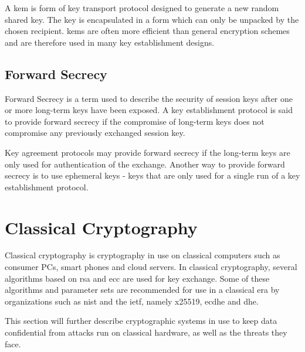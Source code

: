 A \gls{kem} is form of key transport protocol designed to generate a new random shared key. The key is encapsulated in a form which can only be unpacked by the chosen recipient. \glspl{kem} are often more efficient than general encryption schemes and are therefore used in many key establishment designs\cite{boyd2020}.


\subsection{Forward Secrecy}

Forward Secrecy is a term used to describe the security of session keys after one or more long-term keys have been exposed. A key establishment protocol is said to provide forward secrecy if the compromise of long-term keys does not compromise any previously exchanged session key\cite{boyd2020}.

Key agreement protocols may provide forward secrecy if the long-term keys are only used for authentication of the exchange. Another way to provide forward secrecy is to use ephemeral keys - keys that are only used for a single run of a key establishment protocol\cite{boyd2020}.

\section{Classical Cryptography}

Classical cryptography is cryptography in use on classical computers such as consumer PCs, smart phones and cloud servers. In classical cryptography, several algorithms based on \gls{rsa} and \gls{ecc} are used for key exchange. Some of these algorithms and parameter sets are recommended for use in a classical era by organizations such as \gls{nist} and the \gls{ietf}, namely \gls{x25519}\cite{rfc7748}, \gls{ecdhe}\cite{nist2019} and \gls{dhe}\cite{nist2019}.

This section will further describe cryptographic systems in use to keep data confidential from attacks run on classical hardware, as well as the threats they face.

